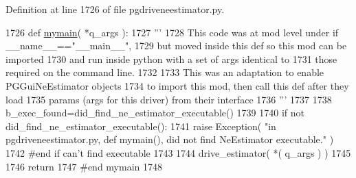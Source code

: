 Definition at line 1726 of file pgdriveneestimator.\+py.


\begin{DoxyCode}
1726 \textcolor{keyword}{def }\hyperlink{namespacenegui_1_1pgdriveneestimator_a9195d73a2642b87625772820ffff8023}{mymain}( *q\_args ):
1727     \textcolor{stringliteral}{'''}
1728 \textcolor{stringliteral}{    This code was at mod level under if \_\_name\_\_=="\_\_main\_\_",}
1729 \textcolor{stringliteral}{    but moved inside this def so this mod can be imported}
1730 \textcolor{stringliteral}{    and run inside python with a set of args identical to}
1731 \textcolor{stringliteral}{    those required on the command line.}
1732 \textcolor{stringliteral}{}
1733 \textcolor{stringliteral}{    This was an adaptation to enable PGGuiNeEstimator objects}
1734 \textcolor{stringliteral}{    to import this mod, then call this def after they load }
1735 \textcolor{stringliteral}{    params (args for this driver) from their interface}
1736 \textcolor{stringliteral}{    '''}
1737 
1738     b\_exec\_found=did\_find\_ne\_estimator\_executable()
1739 
1740     \textcolor{keywordflow}{if} \textcolor{keywordflow}{not} did\_find\_ne\_estimator\_executable():
1741         \textcolor{keywordflow}{raise} Exception( \textcolor{stringliteral}{"in pgdriveneestimator.py, def mymain(), did not find NeEstimator executable."} )
1742     \textcolor{comment}{#end if can't find executable}
1743 
1744     drive\_estimator(  *( q\_args ) )
1745 
1746     \textcolor{keywordflow}{return}
1747 \textcolor{comment}{#end mymain}
1748 
\end{DoxyCode}
